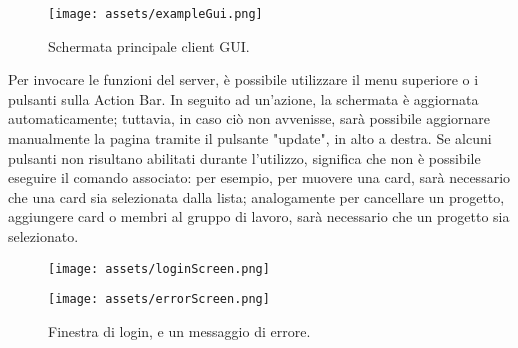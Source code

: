 \documentclass{article}
\begin{document}
\begin{figure}[htbp]
    \texttt{[image: assets/exampleGui.png]}
    \centering
    \caption{\label{fig:exampleGui}Schermata principale client GUI.}
\end{figure}
Per invocare le funzioni del server, è possibile utilizzare il menu superiore o i pulsanti sulla Action Bar. In seguito ad un'azione, la schermata è aggiornata automaticamente; tuttavia, in caso ciò non avvenisse, sarà possibile aggiornare manualmente la pagina tramite il pulsante  "update", in alto a destra. Se alcuni pulsanti non risultano abilitati durante l'utilizzo, significa che non è possibile eseguire il comando associato: per esempio, per muovere una card, sarà necessario che una card sia selezionata dalla lista; analogamente per cancellare un progetto, aggiungere card o membri al gruppo di lavoro, sarà necessario che un progetto sia selezionato.
\begin{figure}[htbp]
    \centering
    \begin{minipage}[b]{0.45\linewidth}
        \texttt{[image: assets/loginScreen.png]}
        \label{fig:minipage1}
    \end{minipage}
    \hfill
    \begin{minipage}[b]{0.45\linewidth}
        \texttt{[image: assets/errorScreen.png]}
        \label{fig:minipage2}
        \vspace*{0.75cm}
    \end{minipage}
    \caption{\label{fig:exampleGui1}Finestra di login, e un messaggio di errore.}
\end{figure}
\end{document}

